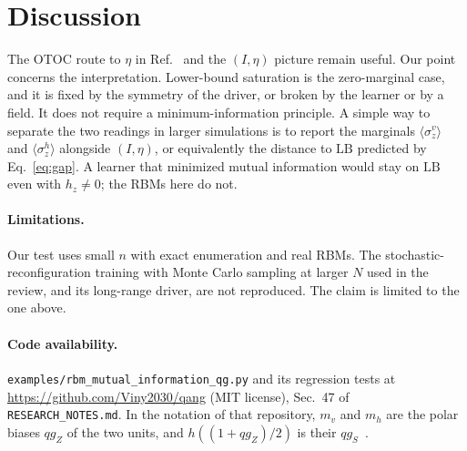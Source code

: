 \documentclass[11pt]{article}
\newcommand{\qv}{m_v}
\newcommand{\qh}{m_h}
\begin{document}
\section{Discussion}

The OTOC route to $\eta$ in Ref.~\cite{singh2026qml} and the $(I,\eta)$ picture remain useful. Our
point concerns the interpretation. Lower-bound saturation is the zero-marginal case, and it is fixed by
the symmetry of the driver, or broken by the learner or by a field. It does not require a
minimum-information principle. A simple way to separate the two readings in larger simulations is to
report the marginals $\langle\sigma_z^v\rangle$ and $\langle\sigma_z^h\rangle$ alongside $(I,\eta)$, or
equivalently the distance to $\mathrm{LB}$ predicted by Eq.~\eqref{eq:gap}. A learner that minimized
mutual information would stay on $\mathrm{LB}$ even with $h_z\neq0$; the RBMs here do not.

\paragraph{Limitations.} Our test uses small $n$ with exact enumeration and real RBMs. The
stochastic-reconfiguration training with Monte Carlo sampling at larger $N$ used in the review, and its
long-range driver, are not reproduced. The claim is limited to the one above.

\paragraph{Code availability.} \texttt{examples/rbm\_mutual\_information\_qg.py} and its regression
tests at \url{https://github.com/Viny2030/qang} (MIT license), Sec.~47 of \texttt{RESEARCH\_NOTES.md}.
In the notation of that repository, $\qv$ and $\qh$ are the polar biases $qg_Z$ of the two units, and
$h((1+qg_Z)/2)$ is their $qg_S$~\cite{monteverde2026qang}.



\end{document}
